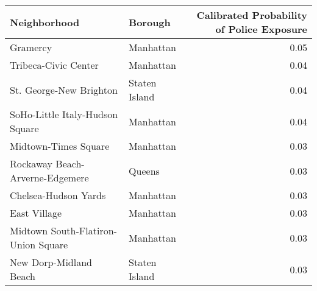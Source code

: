 \begin{tabular}{llr}
\toprule
                       Neighborhood &       Borough &  Calibrated Probability of Police Exposure \\
\midrule
                           Gramercy &     Manhattan &                                       0.05 \\
               Tribeca-Civic Center &     Manhattan &                                       0.04 \\
            St. George-New Brighton & Staten Island &                                       0.04 \\
    SoHo-Little Italy-Hudson Square &     Manhattan &                                       0.04 \\
               Midtown-Times Square &     Manhattan &                                       0.03 \\
    Rockaway Beach-Arverne-Edgemere &        Queens &                                       0.03 \\
               Chelsea-Hudson Yards &     Manhattan &                                       0.03 \\
                       East Village &     Manhattan &                                       0.03 \\
Midtown South-Flatiron-Union Square &     Manhattan &                                       0.03 \\
             New Dorp-Midland Beach & Staten Island &                                       0.03 \\
\bottomrule
\end{tabular}

